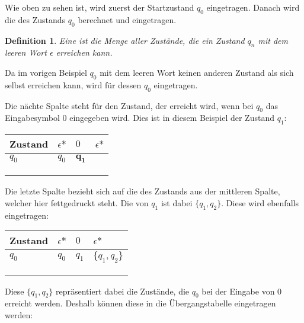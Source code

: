 \documentclass[12pt, oneside]{book}
\newtheorem{definition}{Definition}
\begin{document}
Wie oben zu sehen ist, wird zuerst der Startzustand $q_0$ eingetragen. Danach wird die \ehu des Zustands $q_0$ berechnet und eingetragen.
\begin{definition}
    Eine \ehu ist die Menge aller Zustände, die ein Zustand $q_n$ mit dem leeren Wort $\epsilon$ erreichen kann.
\end{definition}
Da im vorigen Beispiel $q_0$ mit dem leeren Wort keinen anderen Zustand als sich selbst erreichen kann, wird für dessen \ehu $q_0$ eingetragen.\par
Die nächte Spalte steht für den Zustand, der erreicht wird, wenn bei $q_0$ das Eingabesymbol $0$ eingegeben wird. Dies ist in diesem Beispiel der Zustand $q_1$:
\begin{table}[H]
    \centering
    \begin{tabular}{|l|l|l|l|}
    \hline
    Zustand & $\epsilon\mbox{*}$ & $0$   & $\epsilon\mbox{*}$ \\ \hline
    $q_0$   & $q_0$              & $\mathbf{q_1}$ &                    \\ \hline
            &                    &       &                    \\ \hline
            &                    &       &                    \\ \hline
            &                    &       &                    \\ \hline
    \end{tabular}
\end{table}
Die letzte Spalte bezieht sich auf die \ehu des Zustands aus der mittleren Spalte, welcher hier fettgedruckt steht. Die \ehu von $q_1$ ist dabei $\{q_1, q_2\}$. Diese wird ebenfalls eingetragen:
\begin{table}[H]
    \centering
    \begin{tabular}{|l|l|l|l|}
    \hline
    Zustand & $\epsilon\mbox{*}$ & $0$   & $\epsilon\mbox{*}$ \\ \hline
    $q_0$   & $q_0$              & $q_1$ & $\{q_1,q_2\}$      \\ \hline
            &                    &       &                    \\ \hline
            &                    &       &                    \\ \hline
            &                    &       &                    \\ \hline
    \end{tabular}
\end{table}
Diese \ehu $\{q_1, q_2\}$ repräsentiert dabei die Zustände, die $q_0$ bei der Eingabe von $0$ erreicht werden. Deshalb können diese in die Übergangstabelle eingetragen werden:
\end{document}
